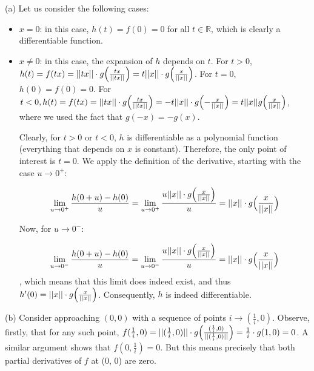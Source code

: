\begin{solution}

    (a) Let us consider the following cases:
    \begin{itemize}
        \item $x = 0$: in this case, $h(t) = f(0) = 0$ for all $t \in \mathbb{R}$, which is clearly a differentiable function.
        \item $x \neq 0$: in this case, the expansion of $h$ depends on $t$. For $t > 0$, $h(t) = f(tx) = \lvert \lvert tx \rvert \rvert \cdot g \Bigl(\frac{tx}{\lvert \lvert tx \rvert \rvert}\Bigr) = t \lvert \lvert x \rvert \rvert \cdot g\Bigl(\frac{x}{\lvert \lvert x \rvert \rvert}\Bigr)$. For $t = 0$, $h(0) = f(0) = 0$. For $t < 0, h(t) = f(tx) = \lvert \lvert tx \rvert \rvert \cdot g\Bigl(\frac{tx}{\lvert \lvert tx \rvert \rvert}\Bigr) = -t \lvert \lvert x \rvert \rvert \cdot g\Bigl(-\frac{x}{\lvert \lvert x \rvert \rvert}\Bigr) = t \lvert \lvert x \rvert \rvert g\Bigl(\frac{x}{\lvert \lvert x \rvert \rvert}\Bigr)$, where we used the fact that $g(-x) = -g(x)$.

        Clearly, for $t > 0$ or $t < 0$, $h$ is differentiable as a polynomial function (everything that depends on $x$ is constant). Therefore, the only point of interest is $t = 0$. We apply the definition of the derivative, starting with the case $u \rightarrow 0^+$:

        $$\lim_{u \rightarrow 0^+} \frac{h(0+u) - h(0)}{u} = \lim_{u \rightarrow 0^+} \frac{u \lvert \lvert x \rvert \rvert \cdot g\Bigl(\frac{x}{\lvert \lvert x \rvert \rvert}\Bigr)}{u} = \lvert \lvert x \rvert \rvert \cdot g\Bigl(\frac{x}{\lvert \lvert x \rvert \rvert}\Bigr)$$

        Now, for $u \rightarrow 0^-$:

       $$\lim_{u \rightarrow 0^-} \frac{h(0+u) - h(0)}{u} = \lim_{u \rightarrow 0^-} \frac{u \lvert \lvert x \rvert \rvert \cdot g\Bigl(\frac{x}{\lvert \lvert x \rvert \rvert}\Bigr)}{u} = \lvert \lvert x \rvert \rvert \cdot g\Bigl(\frac{x}{\lvert \lvert x \rvert \rvert}\Bigr)$$   
       , which means that this limit does indeed exist, and thus $h'(0) = \lvert \lvert x \rvert \rvert \cdot g\Bigl( \frac{x}{\lvert \lvert x \rvert \rvert}\Bigr)$. Consequently, $h$ is indeed differentiable.
    \end{itemize}

    (b) Consider approaching $(0,0)$ with a sequence of points $i \rightarrow (\frac{1}{i}, 0)$. Observe, firstly, that for any such point, $f(\frac{1}{i}, 0) = \lvert \lvert (\frac{1}{i}, 0) \rvert \rvert \cdot g\Bigl(\frac{(\frac{1}{i}, 0)}{\lvert \lvert (\frac{1}{i}, 0) \rvert \rvert }\Bigr) = \frac{1}{i} \cdot g(1, 0) = 0$. A similar argument shows that $f(0, \frac{1}{i}) = 0$. But this means precisely that both partial derivatives of $f$ at (0, 0) are zero.


\end{solution}
